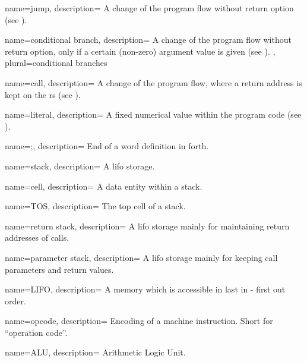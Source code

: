  {
    name={jump},
    description={
      A change of the program flow without return option (see ).
      \nopostdesc
    }
}

 {
    name={conditional branch},
    description={
      A change of the program flow without return option, only if a certain (non-zero)
      argument value is given (see ).
      \nopostdesc
    },
    plural={conditional branches}
}

 {
    name={call},
    description={
      A change of the program flow, where a return address is kept
      on the \gls{rs} (see ).
      \nopostdesc
    }
}

 {
    name={literal},
    description={
      A fixed numerical value within the program code (see ).
      \nopostdesc
    }
}

 {
    name={;},
    description={
      End of a \gls{word} definition in \Gls{forth}.
      \nopostdesc
    }
}

 {
    name={stack},
    description={
      A \gls{lifo} storage.
      \nopostdesc
    }
}

 {
    name={cell},
    description={
      A data entity within a \gls{stack}.
      \nopostdesc
    }
}

 {
    name={TOS},
    description={
      The top \gls{cell} of a \gls{stack}.
      \nopostdesc
    }
}

 {
    name={return stack},
    description={
      A \gls{lifo} storage mainly for maintaining return addresses
      of \glspl{call}.
      \nopostdesc
    }
}

 {
    name={parameter stack},
    description={
      A \gls{lifo} storage mainly for keeping call parameters and
      return values.
      \nopostdesc
    }
}

 {
    name={LIFO},
    description={
      A memory which is accessible in last in - first out order.
      \nopostdesc
    }
}

 {
    name={opcode},
    description={
      Encoding of a machine instruction. Short for ``operation code''.
      \nopostdesc
    }
}

 {
    name={ALU},
    description={
      Arithmetic Logic Unit.
      \nopostdesc
    }
}

